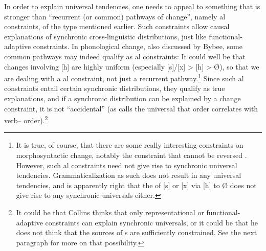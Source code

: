 \documentclass[output=paper]{langsci/langscibook}
\begin{document}
In order to explain universal tendencies, one needs to appeal to something that is stronger than “recurrent (or common) pathways of change”, namely al constraints, of the type mentioned earlier. Such constraints allow causal explanations of synchronic cross-linguistic distributions, just like functional-adap\-tive constraints. In phonological change, also discussed by Bybee, some common pathways may indeed qualify as al constraints: It could well be that changes involving [h] are highly uniform (especially [s]/[x] > [h] > Ø), so that we are dealing with a al constraint, not just a recurrent pathway.\footnote{It is true, of course, that there are some really interesting constraints on morphosyntactic change, notably the constraint that  cannot be reversed \citep{Haspelmath1999_Irrev}. However, such al constraints need not give rise to synchronic universal tendencies. Grammaticalization as such does not result in any universal tendencies, and \citet[§8]{Bybee2006_Univ} is apparently right that the  of [s] or [x] via [h] to Ø does not give rise to any synchronic universals either.} Since such al constraints entail certain synchronic distributions, they qualify as true explanations, and if a synchronic distribution can be explained by a change constraint, it is not “accidental” (as  calls the universal that  order correlates with verb– order).\footnote{It could be that Collins thinks that only representational or functional-adaptive constraints can explain synchronic universals, or it could be that he does not think that the sources of s are sufficiently constrained. See the next paragraph for more on that possibility.}
 
\end{document}
